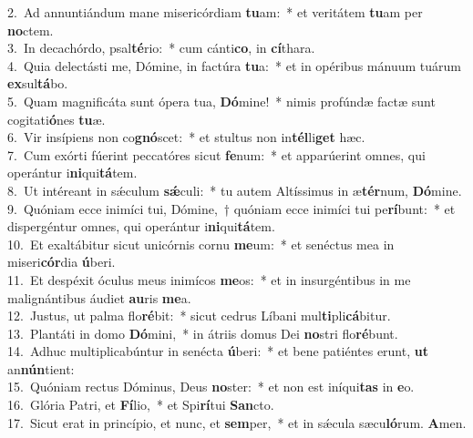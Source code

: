 {2.~}Ad annuntiándum mane misericórdiam \textbf{tu}am:~* et veritátem \textbf{tu}am per \textbf{no}ctem.\\
{3.~}In decachórdo, psal\textbf{té}rio:~* cum cánti\textbf{co}, in \textbf{cí}thara.\\
{4.~}Quia delectásti me, Dómine, in factúra \textbf{tu}a:~* et in opéribus mánuum tuárum \textbf{ex}sul\textbf{tá}bo.\\
{5.~}Quam magnificáta sunt ópera tua, \textbf{Dó}mine!~* nimis profúndæ factæ sunt cogitati\textbf{ó}nes \textbf{tu}æ.\\
{6.~}Vir insípiens non co\textbf{gnó}scet:~* et stultus non in\textbf{tél}li\textbf{get} hæc.\\
{7.~}Cum exórti fúerint peccatóres sicut \textbf{fe}num:~* et apparúerint omnes, qui operántur i\textbf{ni}qui\textbf{tá}tem.\\
{8.~}Ut intéreant in sǽculum \textbf{sǽ}culi:~* tu autem Altíssimus in æ\textbf{tér}num, \textbf{Dó}mine.\\
{9.~}Quóniam ecce inimíci tui, Dómine,~† quóniam ecce inimíci tui pe\textbf{rí}bunt:~* et dispergéntur omnes, qui operántur i\textbf{ni}qui\textbf{tá}tem.\\
{10.~}Et exaltábitur sicut unicórnis cornu \textbf{me}um:~* et senéctus mea in miseri\textbf{cór}dia \textbf{ú}beri.\\
{11.~}Et despéxit óculus meus inimícos \textbf{me}os:~* et in insurgéntibus in me malignántibus áudiet \textbf{au}ris \textbf{me}a.\\
{12.~}Justus, ut palma flo\textbf{ré}bit:~* sicut cedrus Líbani mul\textbf{ti}pli\textbf{cá}bitur.\\
{13.~}Plantáti in domo \textbf{Dó}mini,~* in átriis domus Dei \textbf{no}stri flo\textbf{ré}bunt.\\
{14.~}Adhuc multiplicabúntur in senécta \textbf{ú}beri:~* et bene patiéntes erunt, \textbf{ut} an\textbf{nún}tient:\\
{15.~}Quóniam rectus Dóminus, Deus \textbf{no}ster:~* et non est iníqui\textbf{tas} in \textbf{e}o.\\
{16.~}Glória Patri, et \textbf{Fí}lio,~* et Spi\textbf{rí}tui \textbf{San}cto.\\
{17.~}Sicut erat in princípio, et nunc, et \textbf{sem}per,~* et in sǽcula sæcu\textbf{ló}rum. \textbf{A}men.\\
